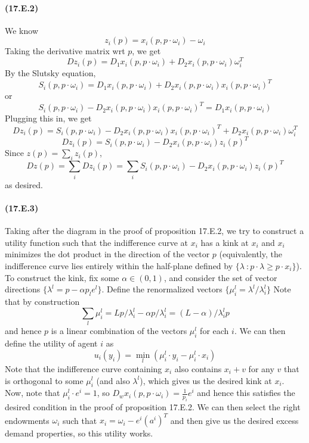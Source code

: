 \documentclass[10pt,letter]{article}
\begin{document}
\paragraph{(17.E.2)}
We know
\[ z_i(p) = x_i(p, p\cdot \omega_i) - \omega_i \]
Taking the derivative matrix wrt $p$, we get
\[ Dz_i(p) = D_1x_i(p, p\cdot \omega_i) + D_2x_i(p, p\cdot \omega_i) \omega_i^T \]
By the Slutsky equation,
\[ S_i(p, p \cdot \omega_i) = D_1x_i(p, p\cdot \omega_i) + D_2 x_i(p, p\cdot\omega_i)x_i(p, p\cdot\omega_i)^T \]
or
\[ S_i(p, p \cdot \omega_i)-  D_2 x_i(p, p\cdot\omega_i)x_i(p, p\cdot\omega_i)^T = D_1x_i(p, p\cdot \omega_i) \]
Plugging this in, we get
\[ Dz_i(p) = S_i(p, p \cdot \omega_i) -  D_2 x_i(p, p\cdot\omega_i)x_i(p, p\cdot\omega_i)^T  + D_2x_i(p, p\cdot \omega_i) \omega_i^T \]
\[ Dz_i(p) = S_i(p, p \cdot \omega_i) -  D_2 x_i(p, p\cdot\omega_i)z_i(p)^T   \]
Since $z(p) = \sum_i z_i(p)$,
\[ Dz(p) = \sum_i Dz_i(p) = \sum_i S_i(p, p \cdot \omega_i) -  D_2 x_i(p, p\cdot\omega_i)z_i(p)^T  \]
as desired.
\paragraph{(17.E.3)}

Taking after the diagram in the proof of proposition 17.E.2, we try to construct a utility function such that the indifference curve at $x_i$ has a kink at $x_i$ and $x_i$ minimizes the dot product in the direction of the vector $p$ (equivalently, the indifference curve lies entirely within the half-plane defined by $\{ \lambda \ : p \cdot \lambda \ge p \cdot x_i \}$). To construct the kink, fix some $\alpha \in (0, 1)$, and consider the set of vector directions $\{ \lambda^l = p - \alpha p_l e^l \}$. Define the renormalized vectors $\{ \mu^l_i = \lambda^l / \lambda^l_i \}$ Note that by construction
\[ \sum_l \mu^l_i = Lp/\lambda^l_i - \alpha p/\lambda^l_i = (L - \alpha)/\lambda^l_i p \]
and hence $p$ is a linear combination of the vectors $\mu^l_i$ for each $i$. We can then define the utility of agent $i$ as
\[ u_i(y_i) = \min_l (\mu^l_i \cdot y_i - \mu^l_i \cdot x_i)  \]
Note that the indifference curve containing $x_i$ also contains $x_i + v$ for any $v$ that is orthogonal to some $\mu^l_i$ (and also $\lambda^l$), which gives us the desired kink at $x_i$. Now, note that $\mu^l_i \cdot e^i = 1$, so $D_wx_i(p, p\cdot \omega_i) = \frac{1}{p_i}e^i$ and hence this satisfies the desired condition in the proof of proposition 17.E.2. We can then select the right endowments $\omega_i$ such that $x_i = \omega_i - e^i (a^i)^T$ and then give us the desired excess demand properties, so this utility works.
\end{document}
